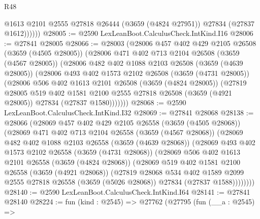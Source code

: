 \begin{lexlean}{R48}
\begin{coremodule}
              @1613
              @2101
              @2555
              @27818
              @26444
              (@3659 (@4824 @27951))
              @27834
              (@27837 @1612))))))
@28005 := @2590 LexLeanBoot.CalculusCheck.IntKind.I16
@28006 := @27841 @28005
@28066 := @28003
    (@28006
      @457
      @402
      @429
      @2105
      @26508
      (@3659 (@4505 @28005))
      (@28006
        @471
        @402
        @713
        @2104
        @26508
        (@3659 (@4567 @28005))
        (@28006
          @482
          @402
          @1088
          @2103
          @26508
          (@3659 (@4639 @28005))
          (@28006
            @493
            @402
            @1573
            @2102
            @26508
            (@3659 (@4731 @28005))
            (@28006
              @506
              @402
              @1613
              @2101
              @26508
              (@3659 (@4824 @28005))
              (@27819
                @28005
                @519
                @402
                @1581
                @2100
                @2555
                @27818
                @26508
                (@3659 (@4921 @28005))
                @27834
                (@27837 @1580)))))))
@28068 := @2590 LexLeanBoot.CalculusCheck.IntKind.I32
@28069 := @27841 @28068
@28138 := @28066
    (@28069
      @457
      @402
      @429
      @2105
      @26558
      (@3659 (@4505 @28068))
      (@28069
        @471
        @402
        @713
        @2104
        @26558
        (@3659 (@4567 @28068))
        (@28069
          @482
          @402
          @1088
          @2103
          @26558
          (@3659 (@4639 @28068))
          (@28069
            @493
            @402
            @1573
            @2102
            @26558
            (@3659 (@4731 @28068))
            (@28069
              @506
              @402
              @1613
              @2101
              @26558
              (@3659 (@4824 @28068))
              (@28069
                @519
                @402
                @1581
                @2100
                @26558
                (@3659 (@4921 @28068))
                (@27819
                  @28068
                  @534
                  @402
                  @1589
                  @2099
                  @2555
                  @27818
                  @26558
                  (@3659 (@5026 @28068))
                  @27834
                  (@27837 @1588))))))))
@28140 := @2590 LexLeanBoot.CalculusCheck.IntKind.I64
@28141 := @27841 @28140
@28224 := fun (kind : @2545) =>
  @27762
    (@27795
      (fun (__a : @2545) =>

\end{coremodule}
\end{lexlean}
